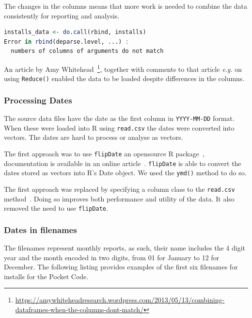 The changes in the columns means that more work is needed to combine the data consistently for reporting and analysis. 

\begin{lstlisting}[language=R, caption=Code snippet in R showing the error reported when columns in the data to import do not match, label=listing:r-import-error-code-snippet]
installs_data <- do.call(rbind, installs)
Error in rbind(deparse.level, ...) : 
  numbers of columns of arguments do not match
\end{lstlisting}

An article by Amy Whitehead~\footnote{\url{https://amywhiteheadresearch.wordpress.com/2013/05/13/combining-dataframes-when-the-columns-dont-match/}}, together with comments to that article \emph{e.g.} on using \texttt{Reduce()} enabled the data to be loaded despite differences in the columns.

\subsubsection{Processing Dates}
The source data files have the date as the first column in \texttt{YYYY-MM-DD} format. When these were loaded into R using \texttt{read.csv} the dates were converted into vectors. The dates are hard to process or analyse as vectors. 

The first approach was to use \texttt{flipDate} an opensource R package~\cite{r_date_conversion_github}, documentation is available in an online article~\cite{r_date_conversion_article}. \texttt{flipDate} is able to convert the dates stored as vectors into R's Date object. We used the \texttt{ymd()} method to do so.

The first approach was replaced by specifying a column class to the \texttt{read.csv} method~\cite{r_bloggers_using_colclasses}. Doing so improves both performance and utility of the data. It also removed the need to use \texttt{flipDate}.

\subsubsection{Dates in filenames}
The filenames represent monthly reports, as such, their name includes the 4 digit year and the month encoded in two digits, from 01 for January to 12 for December. The following listing provides examples of the first six filenames for installs for the Pocket Code.

